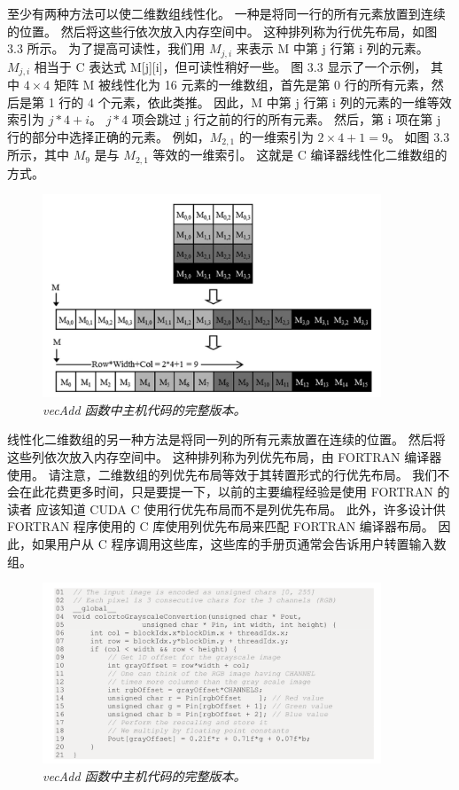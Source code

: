 至少有两种方法可以使二维数组线性化。 一种是将同一行的所有元素放置到连续的位置。 然后将这些行依次放入内存空间中。 
这种排列称为行优先布局，如图 3.3 所示。 为了提高可读性，我们用 $M_{j,i}$ 来表示 M 中第 j 行第 i 列的元素。 
$M_{j,i}$ 相当于 C 表达式 M[j][i]，但可读性稍好一些。 图 3.3 显示了一个示例，
其中 $4 \times 4$ 矩阵 M 被线性化为 16 元素的一维数组，首先是第 0 行的所有元素，然后是第 1 行的 4 个元素，依此类推。 
因此，M 中第 j 行第 i 列的元素的一维等效索引为 $j * 4 + i$。 $j * 4$ 项会跳过 j 行之前的行的所有元素。 
然后，第 i 项在第 j 行的部分中选择正确的元素。 例如，$M_{2,1}$ 的一维索引为 $2 × 4 + 1 = 9$。
如图 3.3 所示，其中 $M_9$ 是与 $M_{2,1}$ 等效的一维索引。 这就是 C 编译器线性化二维数组的方式。

\begin{figure}[H]
	\centering
	\includegraphics[width=0.9\textwidth]{figs/F3.3.png}
	\caption{\textit{\color{red} vecAdd 函数中主机代码的完整版本。}}
\end{figure}

线性化二维数组的另一种方法是将同一列的所有元素放置在连续的位置。 然后将这些列依次放入内存空间中。 
这种排列称为列优先布局，由 FORTRAN 编译器使用。 请注意，二维数组的列优先布局等效于其转置形式的行优先布局。 
我们不会在此花费更多时间，只是要提一下，以前的主要编程经验是使用 FORTRAN 的读者
应该知道 CUDA C 使用行优先布局而不是列优先布局。 
此外，许多设计供 FORTRAN 程序使用的 C 库使用列优先布局来匹配 FORTRAN 编译器布局。 
因此，如果用户从 C 程序调用这些库，这些库的手册页通常会告诉用户转置输入数组。

\begin{figure}[H]
	\centering
	\includegraphics[width=0.9\textwidth]{figs/F3.4.png}
	\caption{\textit{\color{red} vecAdd 函数中主机代码的完整版本。}}
\end{figure}

